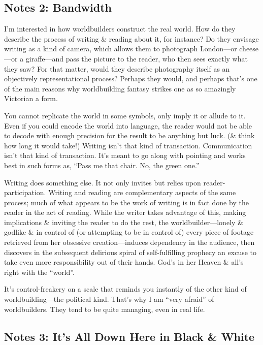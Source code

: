 \documentclass[14pt]{extarticle}
\begin{document}
\subsection*{Notes 2: Bandwidth}

I’m interested in how worldbuilders construct the real world. How do they describe the process of writing \& reading about it, for instance? Do they envisage writing as a kind of camera, which allows them to photograph London—or cheese—or a giraffe—and pass the picture to the reader, who then sees exactly what they saw? For that matter, would they describe photography itself as an objectively representational process? Perhaps they would, and perhaps that’s one of the main reasons why worldbuilding fantasy strikes one as so amazingly Victorian a form.

You cannot replicate the world in some symbols, only imply it or allude to it. Even if you could encode the world into language, the reader would not be able to decode with enough precision for the result to be anything but luck. (\& think how long it would take!) Writing isn’t that kind of transaction. Communication isn’t that kind of transaction. It’s meant to go along with pointing and works best in such forms as, “Pass me that chair. No, the green one.”

Writing does something else. It not only invites but relies upon reader-participation. Writing and reading are complementary aspects of the same process; much of what appears to be the work of writing is in fact done by the reader in the act of reading. While the writer takes advantage of this, making implications \& inviting the reader to do the rest, the worldbuilder—lonely \& godlike \& in control of (or attempting to be in control of) every piece of footage retrieved from her obsessive creation—induces dependency in the audience, then discovers in the subsequent delirious spiral of self-fulfilling prophecy an excuse to take even more responsibility out of their hands. God’s in her Heaven \& all’s right with the “world”.

It’s control-freakery on a scale that reminds you instantly of the other kind of worldbuilding—the political kind. That’s why I am “very afraid” of worldbuilders. They tend to be quite managing, even in real life.

\subsection*{Notes 3: It’s All Down Here in Black \& White}
\end{document}
